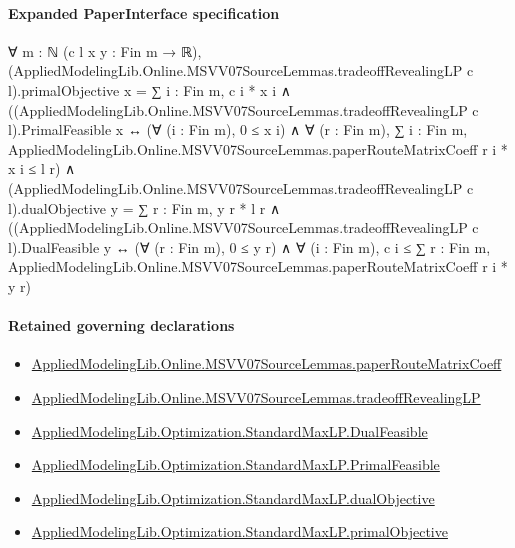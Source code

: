 \documentclass[10pt]{article}
\begin{document}
\paragraph{Expanded PaperInterface specification}
\begin{ReviewVerbatim}
∀ {m : ℕ} (c l x y : Fin m → ℝ),
  (AppliedModelingLib.Online.MSVV07SourceLemmas.tradeoffRevealingLP c l).primalObjective x = ∑ i : Fin m, c i * x i ∧
    ((AppliedModelingLib.Online.MSVV07SourceLemmas.tradeoffRevealingLP c l).PrimalFeasible x ↔
        (∀ (i : Fin m), 0 ≤ x i) ∧
          ∀ (r : Fin m),
            ∑ i : Fin m, AppliedModelingLib.Online.MSVV07SourceLemmas.paperRouteMatrixCoeff r i * x i ≤ l r) ∧
      (AppliedModelingLib.Online.MSVV07SourceLemmas.tradeoffRevealingLP c l).dualObjective y = ∑ r : Fin m, y r * l r ∧
        ((AppliedModelingLib.Online.MSVV07SourceLemmas.tradeoffRevealingLP c l).DualFeasible y ↔
          (∀ (r : Fin m), 0 ≤ y r) ∧
            ∀ (i : Fin m),
              c i ≤ ∑ r : Fin m, AppliedModelingLib.Online.MSVV07SourceLemmas.paperRouteMatrixCoeff r i * y r)
\end{ReviewVerbatim}

\paragraph{Retained governing declarations}
\begin{itemize}\raggedright
\item \hyperlink{governing-declaration-961605a70d70a157}{Applied\allowbreak{}Modeling\allowbreak{}Lib.\allowbreak{}Online.\allowbreak{}MSVV07\allowbreak{}Source\allowbreak{}Lemmas.\allowbreak{}paper\allowbreak{}Route\allowbreak{}Matrix\allowbreak{}Coeff}
\item \hyperlink{governing-declaration-7172ae06131d98cd}{Applied\allowbreak{}Modeling\allowbreak{}Lib.\allowbreak{}Online.\allowbreak{}MSVV07\allowbreak{}Source\allowbreak{}Lemmas.\allowbreak{}tradeoff\allowbreak{}Revealing\allowbreak{}LP}
\item \hyperlink{governing-declaration-abdb5787a7626971}{Applied\allowbreak{}Modeling\allowbreak{}Lib.\allowbreak{}Optimization.\allowbreak{}Standard\allowbreak{}Max\allowbreak{}LP.\allowbreak{}Dual\allowbreak{}Feasible}
\item \hyperlink{governing-declaration-5b414291fe79b441}{Applied\allowbreak{}Modeling\allowbreak{}Lib.\allowbreak{}Optimization.\allowbreak{}Standard\allowbreak{}Max\allowbreak{}LP.\allowbreak{}Primal\allowbreak{}Feasible}
\item \hyperlink{governing-declaration-b12b4262e1edffd6}{Applied\allowbreak{}Modeling\allowbreak{}Lib.\allowbreak{}Optimization.\allowbreak{}Standard\allowbreak{}Max\allowbreak{}LP.\allowbreak{}dual\allowbreak{}Objective}
\item \hyperlink{governing-declaration-a49e3df0a3ee44d1}{Applied\allowbreak{}Modeling\allowbreak{}Lib.\allowbreak{}Optimization.\allowbreak{}Standard\allowbreak{}Max\allowbreak{}LP.\allowbreak{}primal\allowbreak{}Objective}
\end{itemize}
\end{document}
